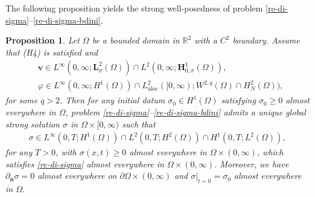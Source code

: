 \documentclass[11pt,reqno]{amsart}
\newtheorem{proposition}{\textbf{Proposition}}[section]
\def\H{\bm{H}}
\def\L{\bm{L}}
\def\vv{\bm{v}}
\begin{document}
The following proposition yields the strong well-posedness of problem
\eqref{re-di-sigma}--\eqref{re-di-sigma-bdini}.
%
\begin{proposition}
\label{sigma-strong}
Let $\Omega$ be a bounded domain in $\mathbb{R}^2$ with a $C^2$ boundary. Assume that (H4) is satisfied and
%
\begin{align*}
&\vv \in L^{\infty}(0,\infty;\L^2_{\sigma}(\Omega))\cap L^2(0,\infty;\H^1_{0,\sigma}(\Omega)),
\\
&\varphi \in L^\infty(0,\infty;H^1(\Omega))\cap L^2_{\mathrm{uloc}}([0,\infty);W^{2,q}(\Omega)\cap H^2_N(\Omega)),
\end{align*}
%
for some $q>2$. Then for any initial datum $\sigma_0 \in H^1(\Omega)$ satisfying $\sigma_0 \geq 0$ almost everywhere in $\Omega$, problem
\eqref{re-di-sigma}--\eqref{re-di-sigma-bdini} admits a unique global strong solution $\sigma$ in $\Omega\times [0,\infty)$ such that
%
\begin{equation}
\label{REG1}
\begin{split}
\sigma \in L^{\infty}(0,T;H^1(\Omega)) \cap L^2(0,T; H^2(\Omega))\cap H^1(0,T;L^2(\Omega)),
\end{split}
\end{equation}
%
for any $T>0$, with $\sigma(x,t)\geq 0$ almost everywhere in $\Omega \times (0,\infty)$,
which satisfies \eqref{re-di-sigma} almost everywhere in $\Omega\times(0,\infty)$. Moreover, we have $\partial_{\boldsymbol{n}} \sigma =0$ almost everywhere on $\partial\Omega\times(0,\infty)$ and  $\sigma|_{t=0}=\sigma_{0}$ almost everywhere in $\Omega$.
\end{proposition}
%
\end{document}
